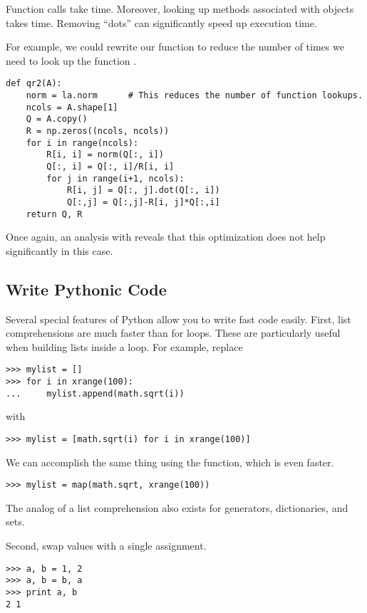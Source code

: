 Function calls take time.
Moreover, looking up methods associated with objects takes time.
Removing ``dots'' can significantly speed up execution time.

For example, we could rewrite our function to reduce the number of times we need to look up the function .

\begin{lstlisting}
def qr2(A):
    norm = la.norm      # This reduces the number of function lookups.
    ncols = A.shape[1]
    Q = A.copy()
    R = np.zeros((ncols, ncols))
    for i in range(ncols):
        R[i, i] = norm(Q[:, i])
        Q[:, i] = Q[:, i]/R[i, i]
        for j in range(i+1, ncols):
            R[i, j] = Q[:, j].dot(Q[:, i])
            Q[:,j] = Q[:,j]-R[i, j]*Q[:,i]
    return Q, R
\end{lstlisting}
Once again, an analysis with  reveals that this optimization does not help significantly in this case.

\subsection*{Write Pythonic Code} %

Several special features of Python allow you to write fast code easily.
First, list comprehensions are much faster than for loops.
These are particularly useful when building lists inside a loop.
For example, replace

\begin{lstlisting}
>>> mylist = []
>>> for i in xrange(100):
...     mylist.append(math.sqrt(i))

\end{lstlisting}
%
with

\begin{lstlisting}
>>> mylist = [math.sqrt(i) for i in xrange(100)]
\end{lstlisting}

We can accomplish the same thing using the  function, which is even faster.

\begin{lstlisting}
>>> mylist = map(math.sqrt, xrange(100))
\end{lstlisting}

The analog of a list comprehension also exists for generators, dictionaries, and sets.

Second, swap values with a single assignment.

\begin{lstlisting}
>>> a, b = 1, 2
>>> a, b = b, a
>>> print a, b
2 1
\end{lstlisting}

